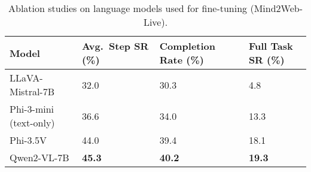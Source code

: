 \begin{table*}[htbp]
\centering
\small
\begin{tabular}{llll}
\toprule
\bfseries Model                  & \bfseries Avg.\   Step SR (\%) & \bfseries Completion Rate  (\%) & \bfseries Full Task SR (\%) \\ \midrule
LLaVA-Mistral-7B       & \num{32.0}                                    & \num{30.3}                                      & \num{4.8}                              \\
Phi-3-mini (text-only) & \num{36.6}	& \num{34.0}	& \num{13.3} \\
Phi-3.5V               & \num{44.0}                                    & \num{39.4}                                     & \num{18.1}                              \\
Qwen2-VL-7B  & \bfseries\num{45.3} &	\bfseries\num{40.2}	& \textbf{\num{19.3}} \\
\bottomrule                            
\end{tabular}
\caption{Ablation studies on language models used for fine-tuning (Mind2Web-Live).
}
\label{tab:m2w_live_diff_slm}
\end{table*}